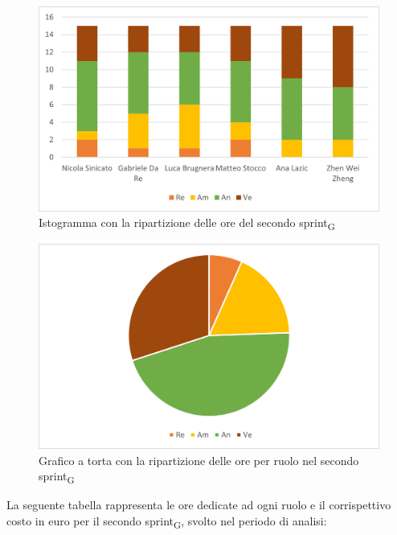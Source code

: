 \begin{figure}[H]
    \centering
    \includegraphics[scale=0.6]{img/grafi preventivo/istogrammi/analisi/sprint2.png}
    \caption{Istogramma con la ripartizione delle ore del secondo sprint\textsubscript{G}}
\end{figure}
\begin{figure}[H]
    \centering
    \includegraphics[scale=0.6]{img/grafi preventivo/torta/analisi/sprint2.png}
    \caption{Grafico a torta con la ripartizione delle ore per ruolo nel secondo sprint\textsubscript{G}}
\end{figure}
La seguente tabella rappresenta le ore dedicate ad ogni ruolo e il corrispettivo costo in euro per il secondo sprint\textsubscript{G}, svolto nel periodo di analisi:

